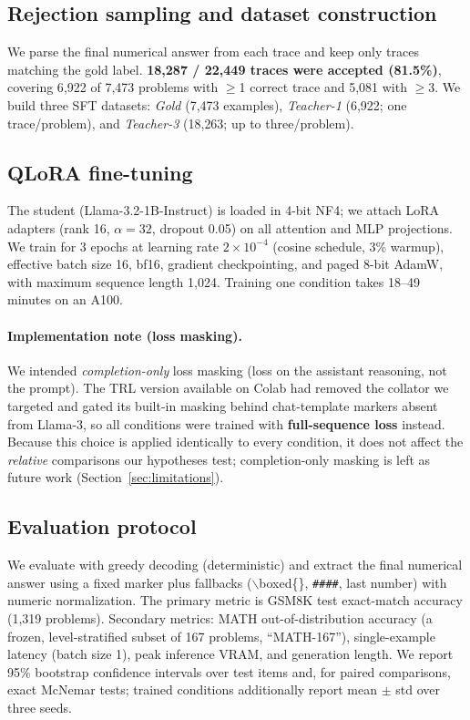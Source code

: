 \documentclass[11pt]{article}
\begin{document}
\subsection{Rejection sampling and dataset construction}
We parse the final numerical answer from each trace and keep only traces matching
the gold label. \textbf{18{,}287 / 22{,}449 traces were accepted (81.5\%)},
covering 6{,}922 of 7{,}473 problems with $\ge$1 correct trace and 5{,}081 with
$\ge$3. We build three SFT datasets: \emph{Gold} (7{,}473 examples), \emph{Teacher-1}
(6{,}922; one trace/problem), and \emph{Teacher-3} (18{,}263; up to three/problem).

\subsection{QLoRA fine-tuning}
The student (Llama-3.2-1B-Instruct) is loaded in 4-bit NF4; we attach LoRA adapters
(rank 16, $\alpha=32$, dropout 0.05) on all attention and MLP projections. We train
for 3 epochs at learning rate $2\times10^{-4}$ (cosine schedule, 3\% warmup),
effective batch size 16, bf16, gradient checkpointing, and paged 8-bit AdamW, with
maximum sequence length 1{,}024. Training one condition takes 18--49 minutes on an
A100.

\paragraph{Implementation note (loss masking).} We intended \emph{completion-only}
loss masking (loss on the assistant reasoning, not the prompt). The TRL version
available on Colab had removed the collator we targeted and gated its built-in
masking behind chat-template markers absent from Llama-3, so all conditions were
trained with \textbf{full-sequence loss} instead. Because this choice is applied
identically to every condition, it does not affect the \emph{relative} comparisons
our hypotheses test; completion-only masking is left as future work
(Section~\ref{sec:limitations}).

\subsection{Evaluation protocol}
We evaluate with greedy decoding (deterministic) and extract the final numerical
answer using a fixed marker plus fallbacks ($\backslash$boxed\{\}, \texttt{\#\#\#\#},
last number) with numeric normalization. The primary metric is GSM8K test
exact-match accuracy (1{,}319 problems). Secondary metrics: MATH out-of-distribution
accuracy (a frozen, level-stratified subset of 167 problems, ``MATH-167''),
single-example latency (batch size 1), peak inference VRAM, and generation length.
We report 95\% bootstrap confidence intervals over test items and, for paired
comparisons, exact McNemar tests; trained conditions additionally report mean
$\pm$ std over three seeds.
\end{document}
